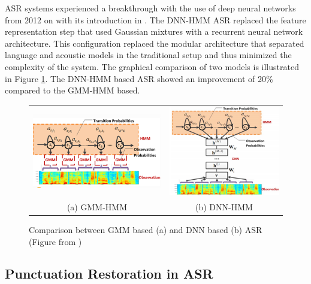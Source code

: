 ASR systems experienced a breakthrough with the use of deep neural networks from 2012 on with its introduction in \cite{asr_dnnhmm}. The DNN-HMM ASR replaced the feature representation step that used Gaussian mixtures with a recurrent neural network architecture. This configuration replaced the modular architecture that separated language and acoustic models in the traditional setup and thus minimized the complexity of the system. The graphical comparison of two models is illustrated in Figure \ref{sota:gmm-dnn-hmm}. The DNN-HMM based ASR showed an improvement of 20\% compared to the GMM-HMM based. 

\begin{figure}
\begin{tabular}{cc}
  \includegraphics[width=0.5\linewidth]{img/gmm-hmm.png} &   \includegraphics[width=0.5\linewidth]{img/dnn-hmm.png} \\
(a) GMM-HMM & (b) DNN-HMM\\[6pt]
\end{tabular}
\caption{Comparison between GMM based (a) and DNN based (b) ASR (Figure from \cite{asr_dnnhmm})}
\label{sota:gmm-dnn-hmm}
\end{figure}

\subsection{Punctuation Restoration in ASR}
\label{sota:punk_on_asr}

